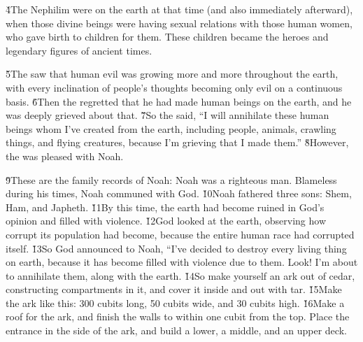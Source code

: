 \v{4}The Nephilim were on the earth at that time (and also immediately afterward), when those divine beings were having sexual relations with those human women, who gave birth to children for them. These children became the heroes and legendary figures of ancient times.

\v{5}The  saw that human evil was growing more and more throughout the earth, with every inclination of people's thoughts becoming only evil on a continuous basis. \v{6}Then the  regretted that he had made human beings on the earth, and he was deeply grieved about that. \v{7}So the  said, ``I will annihilate these human beings whom I've created from the earth, including people, animals, crawling things, and flying creatures, because I'm grieving that I made them.'' \v{8}However, the  was pleased with Noah.

\v{9}These are the family records of Noah: Noah was a righteous man. Blameless during his times, Noah communed with God. \v{10}Noah fathered three sons: Shem, Ham, and Japheth. \v{11}By this time, the earth had become ruined in God's opinion and filled with violence. \v{12}God looked at the earth, observing how corrupt its population had become, because the entire human race had corrupted itself. \v{13}So God announced to Noah, ``I've decided to destroy every living thing on earth, because it has become filled with violence due to them. Look! I'm about to annihilate them, along with the earth. \v{14}So make yourself an ark out of cedar, constructing compartments in it, and cover it inside and out with tar. \v{15}Make the ark like this: 300 cubits long, 50 cubits wide, and 30 cubits high. \v{16}Make a roof for the ark, and finish the walls to within one cubit from the top. Place the entrance in the side of the ark, and build a lower, a middle, and an upper deck.

